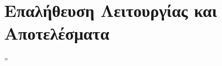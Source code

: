 \chapter{Επαλήθευση Λειτουργίας και Αποτελέσματα} %
\label{chap:Chapter6}

\epigraph{” }{\textit{}}

